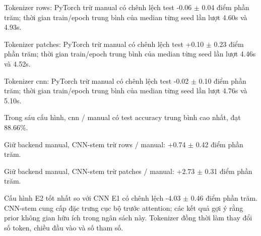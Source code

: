 Tokenizer rows: PyTorch trừ manual có chênh lệch test -0.06 $\pm$ 0.04 điểm phần trăm; thời gian train/epoch trung bình của median từng seed lần lượt 4.60s và 4.93s.

Tokenizer patches: PyTorch trừ manual có chênh lệch test +0.10 $\pm$ 0.23 điểm phần trăm; thời gian train/epoch trung bình của median từng seed lần lượt 4.46s và 4.52s.

Tokenizer cnn: PyTorch trừ manual có chênh lệch test -0.02 $\pm$ 0.10 điểm phần trăm; thời gian train/epoch trung bình của median từng seed lần lượt 4.76s và 5.10s.

Trong sáu cấu hình, cnn / manual có test accuracy trung bình cao nhất, đạt 88.66\%.

Giữ backend manual, CNN-stem trừ rows / manual: +0.74 $\pm$ 0.42 điểm phần trăm.

Giữ backend manual, CNN-stem trừ patches / manual: +2.73 $\pm$ 0.31 điểm phần trăm.

Cấu hình E2 tốt nhất so với CNN E1 có chênh lệch -4.03 $\pm$ 0.46 điểm phần trăm. CNN-stem cung cấp đặc trưng cục bộ trước attention; các kết quả gợi ý rằng prior không gian hữu ích trong ngân sách này. Tokenizer đồng thời làm thay đổi số token, chiều đầu vào và số tham số.
